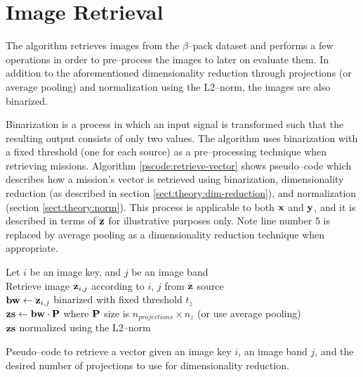 \section{Image Retrieval} \label{sect:meth:image-retrieval}

The \mlblink algorithm retrieves images from the $\beta$--pack dataset and performs a few operations in order to pre--process the images to later on evaluate them. In addition to the aforementioned dimensionality reduction through projections (or average pooling) and normalization using the L2--norm, the images are also binarized. \newline

Binarization is a process in which an input signal is transformed such that the resulting output consists of only two values. The \mlblink algorithm uses binarization with a fixed threshold (one for each source) as a pre--processing technique when retrieving missions. Algorithm \ref{pscode:retrieve-vector} shows pseudo--code which describes how a mission's vector is retrieved using binarization, dimensionality reduction (as described in section \ref{sect:theory:dim-reduction}), and normalization (section \ref{sect:theory:norm}). This process is applicable to both $\boldsymbol{\mathbf{x}}$ and $\boldsymbol{\mathbf{y}}$, and it is described in terms of $\boldsymbol{\mathbf{z}}$ for illustrative purposes only. Note line number $5$ is replaced by average pooling as a dimensionality reduction technique when appropriate.

\vspace{0.4cm}
\begin{algorithm}[H]
    \SetAlgoLined
         {
            Let $i$ be an image key, and $j$ be an image band \\
            Retrieve image $\boldsymbol{\mathbf{z}}_{i,j}$ according to $i$, $j$ from $\boldsymbol{\mathbf{z}}$ source \\
            $\boldsymbol{\mathbf{bw}} \gets \boldsymbol{\mathbf{z}}_{i,j}$ binarized with fixed threshold $t_z$ \\
            $\boldsymbol{\mathbf{zs}} \gets \boldsymbol{\mathbf{bw}} \cdot \boldsymbol{\mathbf{P}}$ where $\boldsymbol{\mathbf{P}}$ size is $n_{projections} \times n_z$ (or use average pooling) \\
            \Return $\boldsymbol{\mathbf{zs}}$ normalized using the L2--norm
        }
    \caption{Pseudo--code to retrieve a vector given an image key $i$, an image band $j$, and the desired number of projections to use for dimensionality reduction.}
    \label{pscode:retrieve-vector}
\end{algorithm}
\vspace{0.4cm}